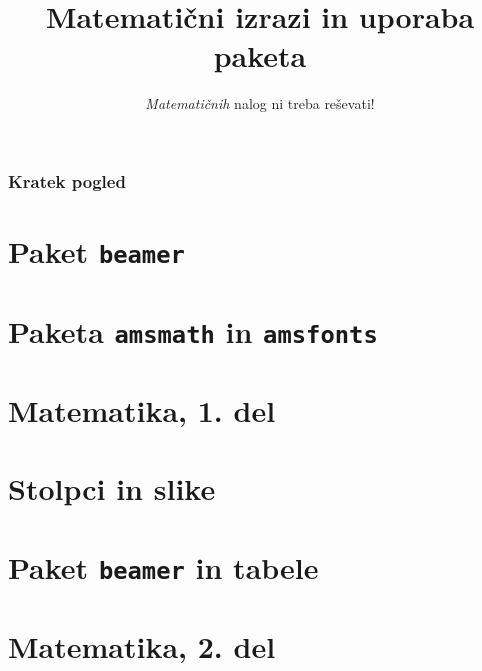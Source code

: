 \documentclass{beamer}
\begin{document}
\title{Matematični izrazi in uporaba paketa}
\subtitle{\emph{Matematičnih} nalog ni treba reševati!}
\date{}


\frame{\titlepage}
\begin{frame}
\frametitle{Kratek pogled}
\tableofcontents%
\end{frame}

\section{Paket \texttt{beamer}}


\section{Paketa \texttt{amsmath} in \texttt{amsfonts}}

\section[Matematika, 1. del\\\large{Analiza, logika, množice}]{Matematika, 1. del}

\section{Stolpci in slike}

\section{Paket \texttt{beamer} in tabele}

\section[Matematika, 2. del\\\large{Zaporedja, algebra, grupe}]{Matematika, 2. del}

\end{document}
